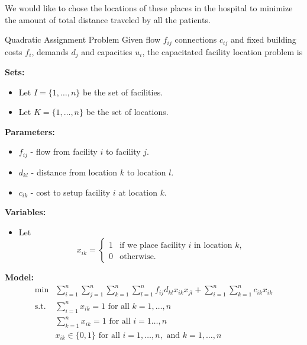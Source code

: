 {We would like to chose the locations of these places in the hospital to minimize the amount of total distance traveled by all the patients. 






\begin{general}{Quadratic Assignment Problem}{\npcomplete}
Given flow $f_{ij}$  connections $c_{ij}$ and fixed building costs $f_i$, demands $d_j$ and capacities $u_i$, the capacitated facility location problem is 

\noindent \textbf{Sets:}
\begin{itemize}
\item Let $I = \{1,\dots, n\}$ be the set of facilities.
\item Let $K = \{1, \dots, n\}$ be the set of locations.
\end{itemize}

\noindent \textbf{Parameters:}
\begin{itemize}
\item $f_{ij}$ - flow from facility $i$ to facility $j$.
\item $d_{kl}$ - distance from location $k$ to location $l$.
\item $c_{ik}$ - cost to setup facility $i$ at location $k$.
\end{itemize}

\noindent \textbf{Variables:}
\begin{itemize}
\item Let 
\begin{equation*}
x_{ik} = \begin{cases}
1 & \text{if we place facility $i$ in location $k$,}\\
0 & \text{otherwise.}
\end{cases}
\end{equation*}
\end{itemize}

\noindent  \textbf{Model:}
\begin{align}
\min & \displaystyle\sum_{i=1}^n\sum_{j=1}^n \sum_{k=1}^n \sum_{l = 1}^n f_{ij}d_{kl}x_{ik}x_{jl} + \sum_{i=1}^n \sum_{k = 1}^n c_{ik} x_{ik} \tag{total cost}\\
\text{s.t.} & \displaystyle\sum_{i=1}^n x_{ik}=1 \text{ for all }k=1,\dots,n \tag{assign facility to location $k$}\\
& \displaystyle \sum_{k=1}^n x_{ik}=1 \text{ for all }i=1\dots,n \tag{assign one location to facility $i$}\\
&x_{ik}\in\{0,1\}\text{ for all } i=1,\dots,n, \text{ and } k = 1, \dots, n \tag{binary decisions}
\end{align}
\end{general}

}
